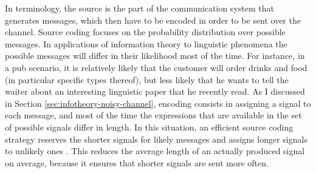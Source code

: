 In  terminology, the source is the part of the communication system that generates messages, which then have to be encoded in order to be sent over the channel. Source coding focuses on the probability distribution over possible messages. In applications of information theory to linguistic phenomena the possible messages will differ in their likelihood most of the time. For instance, in a pub scenario, it is relatively likely that the customer will order drinks and food (in particular specific types thereof), but less likely that he wants to tell the waiter about an interesting linguistic paper that he recently read. As I discussed in Section \ref{sec:infotheory-noisy-channel}, encoding consists in assigning a signal to each message, and most of the time the expressions that are available in the set of possible signals differ in length. In this situation, an efficient source coding strategy reserves the shorter signals for likely messages and assigns longer signals to unlikely ones \citep[402]{shannon1948}. This reduces the average length of an actually produced signal on average, because it ensures that shorter signals are sent more often.

